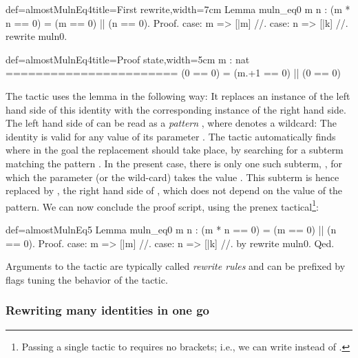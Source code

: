 \begin{coq}{def=almostMulnEq4}{title=First rewrite,width=7cm}
Lemma muln_eq0 m n :
  (m * n == 0) = (m == 0) || (n == 0).
Proof.
case: m => [|m] //.
case: n => [|k] //.
rewrite muln0.
\end{coq}
\begin{coqout}{def=almostMulnEq4}{title=Proof state,width=5cm}
m : nat
=======================
(0 == 0) =
  (m.+1 == 0) || (0 == 0)
\end{coqout}

The  tactic uses the  lemma in the following way:
It replaces an instance of the left hand side of this identity with the
corresponding instance of the right hand side. The left hand side of
 can be read as a \emph{pattern} , where \C{_}
denotes a wildcard: The identity is
valid for any value of its parameter . The tactic
automatically  finds  where in the goal the replacement should take
place, by searching for a subterm matching the pattern .
In the present case, there is only one such subterm,
, for which the parameter (or the wild-card) takes the
value . This subterm is hence replaced by , the right
hand side of , which does not depend on the value of the
pattern. We can now conclude the proof script, using the
prenex  tactical\footnote{Passing a single tactic to
 requires no brackets; i.e., we can write
 instead of .}:

\begin{coq}{def=almostMulnEq5}{}
Lemma muln_eq0 m n : (m * n == 0) = (m == 0) || (n == 0).
Proof.
case: m => [|m] //.
case: n => [|k] //.
by rewrite muln0.
Qed.
\end{coq}

Arguments to the  tactic are typically called
\emph{rewrite rules} and can
be prefixed by flags tuning the behavior of the tactic.


\subsubsection{Rewriting many identities in one go}
\label{sec:multirew}

